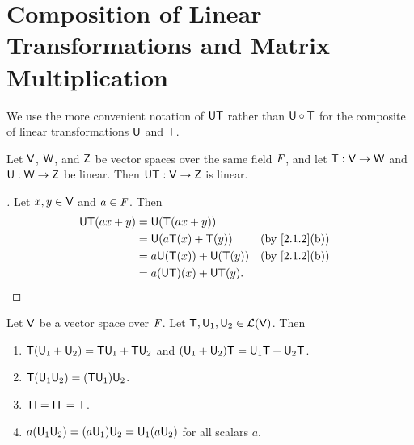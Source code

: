 \section{Composition of Linear Transformations and Matrix Multiplication}\label{sec:2.3}

\begin{note}
  We use the more convenient notation of \(\mathsf{U} \mathsf{T}\) rather than \(\mathsf{U} \circ \mathsf{T}\) for the composite of linear transformations \(\mathsf{U}\) and \(\mathsf{T}\).
\end{note}

\begin{thm}\label{2.9}
  Let \(\mathsf{V}\), \(\mathsf{W}\), and \(\mathsf{Z}\) be vector spaces over the same field \(\mathit{F}\), and let \(\mathsf{T} : \mathsf{V} \to \mathsf{W}\) and \(\mathsf{U} : \mathsf{W} \to \mathsf{Z}\) be linear.
  Then \(\mathsf{U} \mathsf{T} : \mathsf{V} \to \mathsf{Z}\) is linear.
\end{thm}

\begin{proof}[]
  Let \(x, y \in \mathsf{V}\) and \(a \in \mathit{F}\).
  Then
  \begin{align*}
    \U \T(ax + y) & = \U(\T(ax + y))                                            \\
                  & = \U(a \T(x) + \T(y))      &  & \text{(by \cref{2.1.2}(b))} \\
                  & = a \U(\T(x)) + \U(\T(y))  &  & \text{(by \cref{2.1.2}(b))} \\
                  & = a (\U \T)(x) + \U \T(y).
  \end{align*}
\end{proof}

\begin{thm}\label{2.10}
  Let \(\mathsf{V}\) be a vector space over \(\mathit{F}\).
  Let \(\mathsf{T}, \mathsf{U}_1, \mathsf{U}_2 \in \mathcal{L}(\mathsf{V})\).
  Then
  \begin{enumerate}
    \item \(\mathsf{T}(\mathsf{U}_1 + \mathsf{U}_2) = \mathsf{T} \mathsf{U}_1 + \mathsf{T} \mathsf{U}_2\) and \((\mathsf{U}_1 + \mathsf{U}_2) \mathsf{T} = \mathsf{U}_1 \mathsf{T} + \mathsf{U}_2 \mathsf{T}\).
    \item \(\mathsf{T}(\mathsf{U}_1 \mathsf{U}_2) = (\mathsf{T} \mathsf{U}_1) \mathsf{U}_2\).
    \item \(\T \IT = \IT \T = \T\).
    \item \(a(\mathsf{U}_1 \mathsf{U}_2) = (a \mathsf{U}_1) \mathsf{U}_2 = \mathsf{U}_1 (a \mathsf{U}_2)\) for all scalars \(a\).
  \end{enumerate}
\end{thm}

